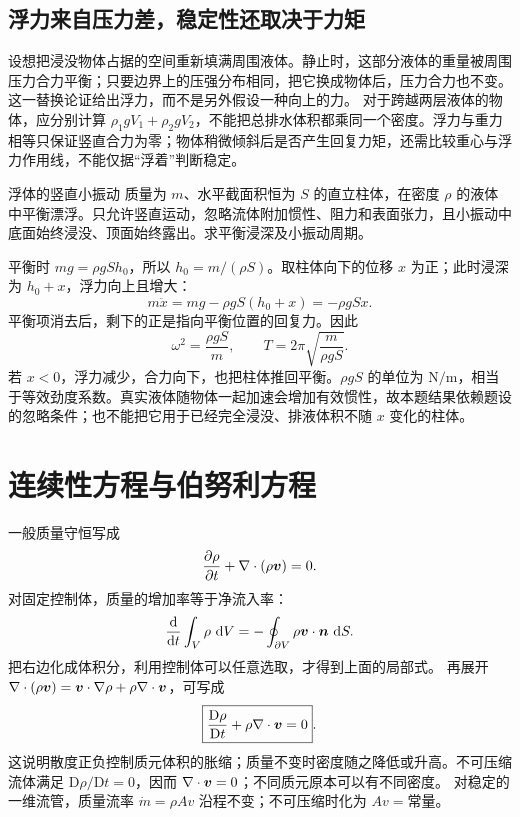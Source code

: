 \subsection{浮力来自压力差，稳定性还取决于力矩}
设想把浸没物体占据的空间重新填满周围液体。静止时，这部分液体的重量被周围压力合力平衡；只要边界上的压强分布相同，把它换成物体后，压力合力也不变。这一替换论证给出浮力，而不是另外假设一种向上的力。
对于跨越两层液体的物体，应分别计算 $\rho_1gV_1+\rho_2gV_2$，不能把总排水体积都乘同一个密度。浮力与重力相等只保证竖直合力为零；物体稍微倾斜后是否产生回复力矩，还需比较重心与浮力作用线，不能仅据“浮着”判断稳定。

\begin{origexamplebox}{浮体的竖直小振动}\label{ch13:ex:teaching-buoyancy}
质量为 $m$、水平截面积恒为 $S$ 的直立柱体，在密度 $\rho$ 的液体中平衡漂浮。只允许竖直运动，忽略流体附加惯性、阻力和表面张力，且小振动中底面始终浸没、顶面始终露出。求平衡浸深及小振动周期。

\ThQFloat
\end{origexamplebox}
\begin{xesolution}
\ThAFloat

平衡时 $mg=\rho gSh_0$，所以 $h_0=m/(\rho S)$。取柱体向下的位移 $x$ 为正；此时浸深为 $h_0+x$，浮力向上且增大：
\[
 m\ddot x=mg-\rho gS(h_0+x)=-\rho gSx.
\]
平衡项消去后，剩下的正是指向平衡位置的回复力。因此
\[
 \omega^2=\frac{\rho gS}{m},\qquad
 T=2\pi\sqrt{\frac{m}{\rho gS}}.
\]
若 $x<0$，浮力减少，合力向下，也把柱体推回平衡。$\rho gS$ 的单位为 $\mathrm{N/m}$，相当于等效劲度系数。真实液体随物体一起加速会增加有效惯性，故本题结果依赖题设的忽略条件；也不能把它用于已经完全浸没、排液体积不随 $x$ 变化的柱体。
\end{xesolution}

\section{连续性方程与伯努利方程}\label{ch13:sec:bernoulli}

一般质量守恒写成
\begin{equation}
 \frac{\partial\rho}{\partial t}+\nabla\cdot(\rho\bm{v})=0.
\end{equation}
对固定控制体，质量的增加率等于净流入率：
\[
 \frac{\mathop{}\!\mathrm d}{\mathop{}\!\mathrm d t}\int_V\rho\,\mathop{}\!\mathrm d V
 =-\oint_{\partial V}\rho\bm{v}\cdot\bm{n}\,\mathop{}\!\mathrm d S.
\]
把右边化成体积分，利用控制体可以任意选取，才得到上面的局部式。
再展开 $\nabla\cdot(\rho\bm{v})=\bm{v}\cdot\nabla\rho+\rho\nabla\cdot\bm{v}$，可写成
\[
 \boxed{\frac{\mathrm D\rho}{\mathrm Dt}+\rho\nabla\cdot\bm{v}=0}.
\]
这说明散度正负控制质元体积的胀缩；质量不变时密度随之降低或升高。不可压缩流体满足
$\mathrm D\rho/\mathrm Dt=0$，因而 $\nabla\cdot\bm{v}=0$；不同质元原本可以有不同密度。
对稳定的一维流管，质量流率 $\dot m=\rho Av$ 沿程不变；不可压缩时化为 $Av=\text{常量}$。

